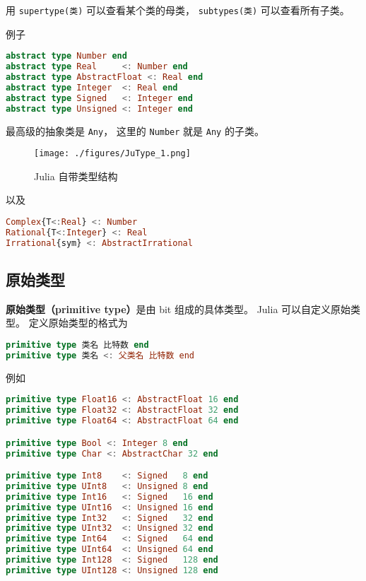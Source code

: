 用 \verb|supertype(类)| 可以查看某个类的母类， \verb|subtypes(类)| 可以查看所有子类。

例子
\begin{lstlisting}[language=julia]
abstract type Number end
abstract type Real     <: Number end
abstract type AbstractFloat <: Real end
abstract type Integer  <: Real end
abstract type Signed   <: Integer end
abstract type Unsigned <: Integer end
\end{lstlisting}
最高级的抽象类是 \verb|Any|， 这里的 \verb|Number| 就是 \verb|Any| 的子类。

\begin{figure}[ht]
\centering
\texttt{[image: ./figures/JuType\_1.png]}
\caption{Julia 自带类型结构} \label{JuType_fig1}
\end{figure}
以及
\begin{lstlisting}[language=julia]
Complex{T<:Real} <: Number
Rational{T<:Integer} <: Real
Irrational{sym} <: AbstractIrrational
\end{lstlisting}


\subsection{原始类型}
\textbf{原始类型（primitive type）}是由 bit 组成的具体类型。 Julia 可以自定义原始类型。 定义原始类型的格式为
\begin{lstlisting}[language=julia]
primitive type 类名 比特数 end
primitive type 类名 <: 父类名 比特数 end
\end{lstlisting}
例如
\begin{lstlisting}[language=julia]
primitive type Float16 <: AbstractFloat 16 end
primitive type Float32 <: AbstractFloat 32 end
primitive type Float64 <: AbstractFloat 64 end

primitive type Bool <: Integer 8 end
primitive type Char <: AbstractChar 32 end

primitive type Int8    <: Signed   8 end
primitive type UInt8   <: Unsigned 8 end
primitive type Int16   <: Signed   16 end
primitive type UInt16  <: Unsigned 16 end
primitive type Int32   <: Signed   32 end
primitive type UInt32  <: Unsigned 32 end
primitive type Int64   <: Signed   64 end
primitive type UInt64  <: Unsigned 64 end
primitive type Int128  <: Signed   128 end
primitive type UInt128 <: Unsigned 128 end
\end{lstlisting}

